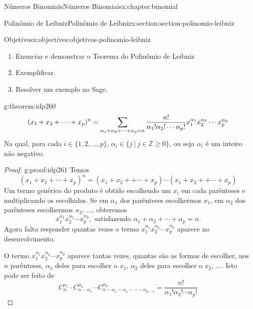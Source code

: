 \documentclass[oneside,10pt,]{book}
\numberwithin{equation}{section}
\begin{document}
\begin{chapterptx}{Números Binomiais}{}{Números Binomiais}{}{}{x:chapter:binomial}
\typeout{************************************************}
%
\begin{sectionptx}{Polinômio de Leibniz}{}{Polinômio de Leibniz}{}{}{x:section:section-polinomio-leibniz}
\begin{objectives}{Objetivos}{x:objectives:objetivos-polinomio-leibniz}
%
\begin{enumerate}
\item{}Enunciar e demonstrar o Teorema do Polinômio de Leibniz%
\item{}Exemplificar.%
\item{}Resolver um exemplo no Sage.%
\end{enumerate}
\end{objectives}
\begin{theorem}{}{}{g:theorem:idp260}%
%
\begin{equation*}
(x_1+x_2+\cdots + x_p)^n   = \sum_{\alpha_1 + \alpha_2 +\cdots + \alpha_p = n} \frac{n!}{\alpha_1!\alpha_2!\cdots\alpha_p!}x_1^{\alpha_1}x_2^{\alpha_2}\cdots x_p^{\alpha_p}\\
\end{equation*}
Na qual, para cada \(i\in\{1, 2, \ldots, p\}\), \(\alpha_i\in \{j ~|~ j\in \mathbb{Z}\geq 0\}\), ou seja \(\alpha_i\) é um inteiro não negativo.%
\end{theorem}
\begin{proof}{}{g:proof:idp261}
Temos%
\begin{equation*}
(x_1+x_2+\cdots + x_p)^n  = (x_1+x_2++\cdots + x_p)\cdots(x_1+x_2++\cdots + x_p)
\end{equation*}
Um termo genérico do produto é obtido escolhendo um \(x_i\) em cada parênteses e multiplicando os escolhidos. Se em \(\alpha_1\) dos parênteses escolhermos \(x_1\), em \(\alpha_2\) dos parênteses escolhermos \(x_2\), \(\ldots\), obteremos%
\begin{equation*}
x_1^{\alpha_1}x_2^{\alpha_2}\cdots x_p^{\alpha_p}, \text{ satisfazendo } \alpha_1 + \alpha_2 +\cdots + \alpha_p = n. 
\end{equation*}
Agora falta responder quantas vezes o termo \(x_1^{\alpha_1}x_2^{\alpha_2}\cdots x_p^{\alpha_p}\) aparece no desenvolvimento.%
\par
O termo \(x_1^{\alpha_1}x_2^{\alpha_2}\cdots x_p^{\alpha_p}\) aparece tantas vezes, quantas são as formas de escolher, nos \(n\) parênteses, \(\alpha_1\) deles para escolher o \(x_1\), \(\alpha_2\) deles para escolher o \(x_2\), \(\ldots\). Isto pode ser feito de%
\begin{equation*}
C_n^{\alpha_1}\cdot C_{n-\alpha_1}^{\alpha_2}\cdots C_{n-\alpha_1-\alpha_2-\cdots -\alpha_{p-1}}^{\alpha_p} = \frac{n!}{\alpha_1!\alpha_2!\cdots\alpha_p!} 

\end{equation*}
\end{proof}
\end{sectionptx}
\end{chapterptx}
\end{document}
